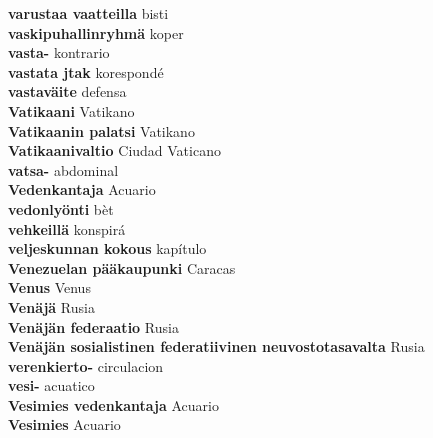 \textbf{ varustaa vaatteilla  } bisti \\
\textbf{ vaskipuhallinryhmä  } koper \\
\textbf{ vasta-  } kontrario \\
\textbf{ vastata jtak  } korespondé \\
\textbf{ vastaväite  } defensa \\
\textbf{ Vatikaani  } Vatikano \\
\textbf{ Vatikaanin palatsi  } Vatikano \\
\textbf{ Vatikaanivaltio  } Ciudad Vaticano \\
\textbf{ vatsa-  } abdominal \\
\textbf{ Vedenkantaja  } Acuario \\
\textbf{ vedonlyönti  } bèt \\
\textbf{ vehkeillä  } konspirá \\
\textbf{ veljeskunnan kokous  } kapítulo \\
\textbf{ Venezuelan pääkaupunki  } Caracas \\
\textbf{ Venus  } Venus \\
\textbf{ Venäjä  } Rusia \\
\textbf{ Venäjän federaatio  } Rusia \\
\textbf{ Venäjän sosialistinen federatiivinen neuvostotasavalta  } Rusia \\
\textbf{ verenkierto-  } circulacion \\
\textbf{ vesi-  } acuatico \\
\textbf{ Vesimies vedenkantaja  } Acuario \\
\textbf{ Vesimies  } Acuario \\
